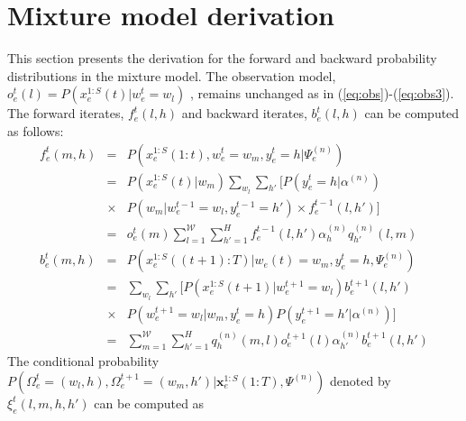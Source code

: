 \documentclass{bioinfo}
\begin{document}
\section{Mixture model derivation}
\label{sec:mixt-model-deriv}
This section presents the derivation for the forward and backward
probability distributions in the mixture model. The observation model, $o^t_e(l)=P(x^{1:S}_e(t) | w^t_e=w_l)$ , remains unchanged as in
(\ref{eq:obs})-(\ref{eq:obs3}). 
The forward iterates, $f_e^t(l, h)$ and backward iterates, $b_e^t(l,
h)$ can  be computed as follows: 
\begin{eqnarray}
  \label{eq:mixture-update}
  f^{t}_{e}(m, h) &=& P(x_{e}^{1:S}(1:t) , w_{e}^{t} = w_{m},
  y_e^t = h | \Psi^{(n)}_{e}) \\
&=& P(x^{1:S}_e(t) | w_m) \sum_{w_l} \sum_{h'}
\Big[ P(y^t_e=h | \alpha^{(n)})  \nonumber \\
&\times& P(w_m | w^{t-1}_e = w_l, y^{t-1}_e = h')  \times f_e^{t-1}(l, h')
\Big]\\
&=& o^{t}_{e}(m) \sum_{l=1}^{{\mathcal W}} \sum_{h'=1}^H
f_{e}^{t-1}(l, h') \alpha_h^{(n)} q_{h'}^{(n)}(l, m) \\
  b^{t}_{e}(m, h) &=& P(x^{1:S}_{e}((t+1):T) | w_{e}(t) = w_{m}, y_e^{t}=h,
  \Psi^{(n)}_{e})  \\
&=&  \sum_{w_l} \sum_{h'} \Big[ P(x^{1:S}_e(t+1) | w^{t+1}_e = w_l)
  b_e^{t+1}(l, h')\nonumber \\
&\times& P(w^{t+1}_e = w_l | w_m, y^{t}_e = h)   P(y^{t+1}_e=h' | \alpha^{(n)}) 
\Big]\\
\label{eq:mixture-update-1}
&=& \sum_{m=1}^{{\mathcal W}}\sum_{h'=1}^H q_{h}^{(n)}(m, l) o^{t+1}_{e}(l) \alpha^{(n)}_{h'}b^{t+1}_{e}(l,h')
\end{eqnarray}
The conditional probability $P(\Omega_e^{t}=(w_l, h), \Omega_e^{t+1}
=(w_m, h') | \mathbf{x}_e^{1:S}(1:T) , \Psi^{(n)})$ denoted by $\xi^t_e(l,m,h,h') $ can be computed as
\end{document}
